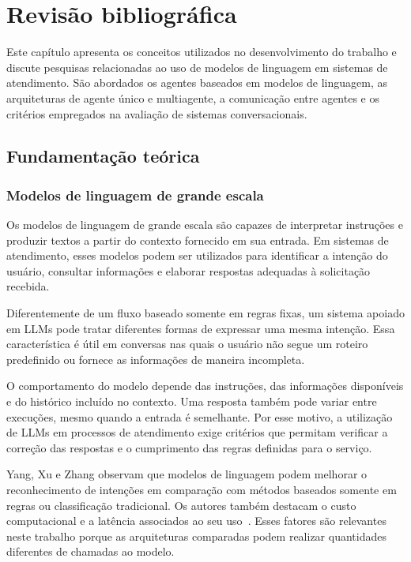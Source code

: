 \chapter{Revisão bibliográfica}\label{cap:revisao}

Este capítulo apresenta os conceitos utilizados no desenvolvimento do trabalho e discute pesquisas relacionadas ao uso de modelos de linguagem em sistemas de atendimento. São abordados os agentes baseados em modelos de linguagem, as arquiteturas de agente único e multiagente, a comunicação entre agentes e os critérios empregados na avaliação de sistemas conversacionais.

\section{Fundamentação teórica}\label{sec:fundamentacao}

\subsection{Modelos de linguagem de grande escala}
\label{subsec:llm}

Os modelos de linguagem de grande escala são capazes de interpretar instruções e produzir textos a partir do contexto fornecido em sua entrada. Em sistemas de atendimento, esses modelos podem ser utilizados para identificar a intenção do usuário, consultar informações e elaborar respostas adequadas à solicitação recebida.

Diferentemente de um fluxo baseado somente em regras fixas, um sistema apoiado em \glspl{LLM} pode tratar diferentes formas de expressar uma mesma intenção. Essa característica é útil em conversas nas quais o usuário não segue um roteiro predefinido ou fornece as informações de maneira incompleta.

O comportamento do modelo depende das instruções, das informações disponíveis e do histórico incluído no contexto. Uma resposta também pode variar entre execuções, mesmo quando a entrada é semelhante. Por esse motivo, a utilização de \glspl{LLM} em processos de atendimento exige critérios que permitam verificar a correção das respostas e o cumprimento das regras definidas para o serviço.

Yang, Xu e Zhang observam que modelos de linguagem podem melhorar o reconhecimento de intenções em comparação com métodos baseados somente em regras ou classificação tradicional. Os autores também destacam o custo computacional e a latência associados ao seu uso~\cite{yang2025}. Esses fatores são relevantes neste trabalho porque as arquiteturas comparadas podem realizar quantidades diferentes de chamadas ao modelo.

